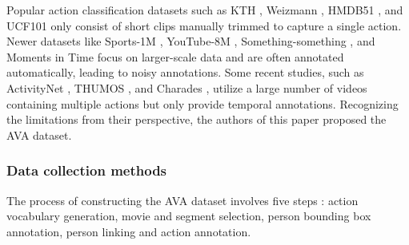 \documentclass[10pt,onecolumn,letterpaper]{article}
\begin{document}
Popular action classification datasets such as KTH \cite{KTH}, Weizmann
\cite{Weizmann}, HMDB51 \cite{HMDB51}, and UCF101 \cite{UCF101} only consist of
short clips manually trimmed to capture a single action. Newer datasets like
Sports-1M \cite{Sports1M}, YouTube-8M \cite{YouTube8M}, Something-something
\cite{somethingsomething}, and Moments in Time \cite{momentsintime} focus on
larger-scale data and are often annotated automatically, leading to noisy
annotations. Some recent studies, such as ActivityNet \cite{ActivityNet}, THUMOS
\cite{THUMOS}, and Charades \cite{Charades}, utilize a large number of videos
containing multiple actions but only provide temporal annotations. Recognizing
the limitations from their perspective, the authors of this paper proposed the
AVA dataset.

\subsubsection{Data collection methods}

The process of constructing the AVA dataset involves five steps : action
vocabulary generation, movie and segment selection, person bounding box
annotation, person linking and action annotation.
\end{document}
